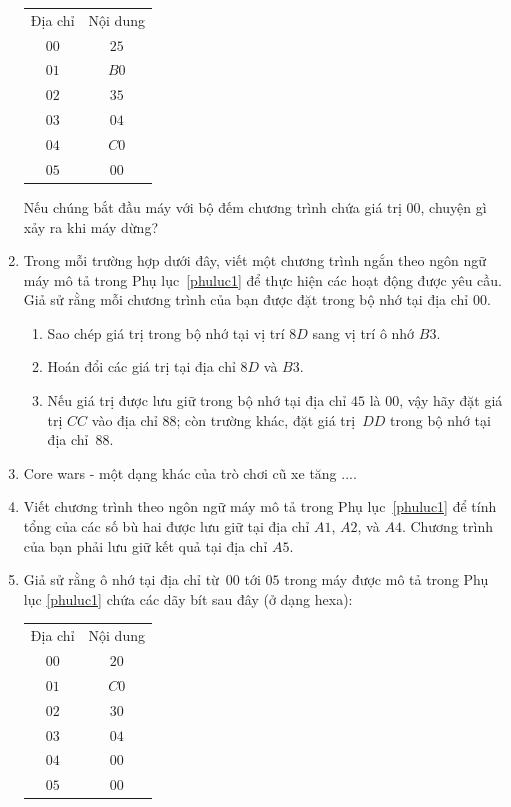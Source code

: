 \begin{multicols}{2}
\begin{enumerate}
    \begin{tabular}{cc}
      Địa chỉ & Nội dung \\
      $00$    & $25$     \\
      $01$    & $B0$     \\
      $02$    & $35$     \\
      $03$    & $04$     \\
      $04$    & $C0$     \\
      $05$    & $00$  
    \end{tabular}

    Nếu chúng bắt đầu máy với bộ đếm chương trình chứa giá trị $00$, chuyện gì xảy ra khi
    máy dừng?

  \item Trong mỗi trường hợp dưới đây, viết một chương trình ngắn theo ngôn ngữ máy mô tả
    trong Phụ lục~\ref{phuluc1} để thực hiện các hoạt động được yêu cầu. Giả sử rằng mỗi
    chương trình của bạn được đặt trong bộ nhớ tại địa chỉ $00$.

    \begin{enumerate}
    \item Sao chép giá trị trong bộ nhớ tại vị trí $8D$ sang vị trí ô nhớ $B3$.

    \item Hoán đổi các giá trị tại địa chỉ $8D$ và $B3$.

    \item Nếu giá trị được lưu giữ trong bộ nhớ tại địa chỉ $45$ là $00$, vậy hãy đặt giá
      trị $CC$ vào địa chỉ $88$; còn trường khác, đặt giá trị~$DD$ trong bộ nhớ tại địa
      chỉ~$88$.
    \end{enumerate}

  \item Core wars - một dạng khác của trò chơi cũ xe tăng ....

  \item Viết chương trình theo ngôn ngữ máy mô tả trong Phụ lục~\ref{phuluc1} để tính tổng
    của các số bù hai được lưu giữ tại địa chỉ $A1$, $A2$, và $A4$. Chương trình của bạn
    phải lưu giữ kết quả tại địa chỉ $A5$.

  \item Giả sử rằng ô nhớ tại địa chỉ từ~$00$ tới $05$ trong máy được mô tả trong Phụ lục
    \ref{phuluc1} chứa các dãy bít sau đây (ở dạng hexa):

    \begin{tabular}{cc}
      Địa chỉ & Nội dung \\
      $00$    & $20$     \\
      $01$    & $C0$     \\
      $02$    & $30$     \\
      $03$    & $04$     \\
      $04$    & $00$     \\
      $05$    & $00$  
    \end{tabular}


\end{enumerate}
\end{multicols}
